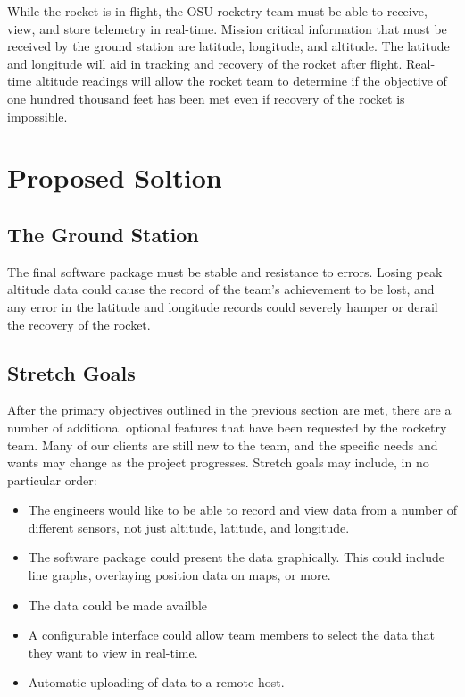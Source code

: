 \documentclass[10pt,journal,draftclsnofoot,onecolumn]{IEEEtran}
\begin{document}
While the rocket is in flight, the \ac{OSU} rocketry team
must be able to receive, view, and store telemetry in real-time.
Mission critical information that must be received by the ground
station are latitude, longitude, and altitude. The latitude
and longitude will aid in tracking and recovery of the rocket
after flight. Real-time altitude readings will allow the rocket
team to determine if the objective of one hundred thousand feet
has been met even if recovery of the rocket is impossible.


\section{Proposed Soltion}


\subsection{The Ground Station}

The final software package must be stable and resistance to errors.
Losing peak altitude data could cause the record of the team's
achievement to be lost, and any error in the latitude
and longitude records could severely hamper or derail
the recovery of the rocket.

\subsection{Stretch Goals}
After the primary objectives outlined in the previous section
are met, there are a number of additional optional features
that have been requested by the rocketry team.
Many of our clients are still new to the team, and the specific
needs and wants may change as the project progresses.
Stretch goals may include, in no particular order:

\begin{itemize}
\item The engineers would like to be able to record and view data
from a number of different sensors, not just altitude,
latitude, and longitude.

\item The software package could present the data graphically.
This could include line graphs, overlaying position data
on maps, or more.

\item The data could be made availble 

\item A configurable interface could allow team members
to select the data that they want to view in real-time.

\item Automatic uploading of data to a remote host.

\end{itemize}
\end{document}
